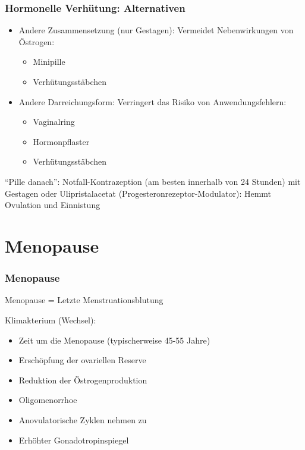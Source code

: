 \documentclass{beamer}
\begin{document}
\begin{frame}
\frametitle{Hormonelle Verhütung: Alternativen}

\begin{itemize}
\item
Andere Zusammensetzung (nur Gestagen): Vermeidet Nebenwirkungen von Östrogen:
\begin{itemize}
\item
Minipille
\item
Verhütungsstäbchen
\end{itemize}
\pause
\item
Andere Darreichungsform: Verringert das Risiko von Anwendungsfehlern:
\begin{itemize}
\item
Vaginalring
\item
Hormonpflaster
\item
Verhütungsstäbchen
\end{itemize}

\end{itemize}

\pause
``Pille danach'':  Notfall-Kontrazeption (am besten innerhalb von 24 Stunden) mit Gestagen oder Ulipristalacetat (Progesteronrezeptor-Modulator): Hemmt Ovulation und Einnistung



\end{frame}

\section{Menopause}




\begin{frame}
\frametitle{Menopause}



Menopause = Letzte Menstruationsblutung

Klimakterium (Wechsel):
\begin{itemize}
\item
Zeit um die Menopause (typischerweise 45-55 Jahre)
\item
Erschöpfung der ovariellen Reserve 
\item
Reduktion der Östrogenproduktion
\item
 Oligomenorrhoe
\item
 Anovulatorische Zyklen nehmen zu
\item 
Erhöhter Gonadotropinspiegel

\end{itemize}

\end{frame}
\end{document}
